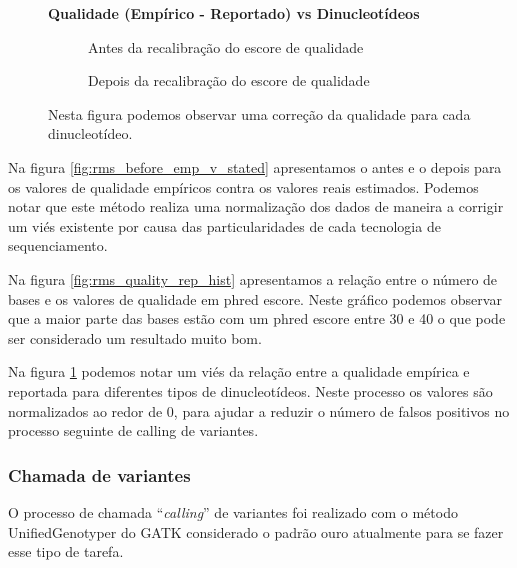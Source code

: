 {\begin{landscape}
\begin{figure}
\centering
\Large\textbf{Qualidade (Empírico - Reportado) vs Dinucleotídeos}\par\medskip
\begin{subfigure}{.7\textwidth}
  \centering
  \caption{Antes da recalibração do escore de qualidade}
\end{subfigure}%
\begin{subfigure}{.7\textwidth}
  \centering
  \caption{Depois da recalibração do escore de qualidade}
\end{subfigure}
\caption[Qualidade (Empírico - Reportado) vs Dinucleotídeos]{Nesta figura podemos observar uma correção da qualidade para cada dinucleotídeo.}
\label{fig:rms_qual_diff_v_Dinuc}
\end{figure}

\end{landscape}

}


Na figura \ref{fig:rms_before_emp_v_stated} apresentamos o antes e o depois para os valores de qualidade empíricos contra os valores reais estimados. Podemos notar que este método realiza uma normalização dos dados de maneira a corrigir um viés existente por causa das particularidades de cada tecnologia de sequenciamento.

Na figura \ref{fig:rms_quality_rep_hist} apresentamos a relação entre o número de bases e os valores de qualidade em phred escore. Neste gráfico podemos observar que a maior parte das bases estão com um phred escore entre 30 e 40 o que pode ser considerado um resultado muito bom.

Na figura \ref{fig:rms_qual_diff_v_Dinuc} podemos notar um viés da relação entre a qualidade empírica e reportada para diferentes tipos de dinucleotídeos. Neste processo os valores são normalizados ao redor de 0, para ajudar a reduzir o número de falsos positivos no processo seguinte de calling de variantes.

\subsubsection{Chamada de variantes}

O processo de chamada ``\textit{calling}'' de variantes foi realizado com o método UnifiedGenotyper do GATK considerado o padrão ouro atualmente para se fazer esse tipo de tarefa.

